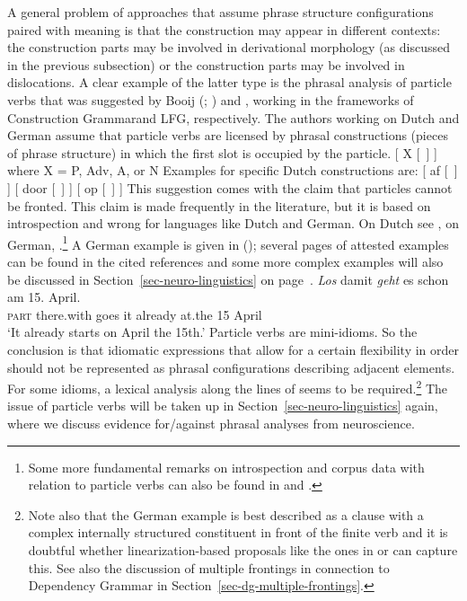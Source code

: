 \begin{exe}
\begin{xlist}[iv.]
\begin{exe}
\begin{xlist}[iv.]
A general problem of approaches that assume phrase structure configurations paired with meaning is
that the construction may appear in different contexts: the construction parts may be involved in
derivational morphology (as discussed in the previous subsection) or the construction parts may be
involved in dislocations. A clear example of the latter type is the phrasal analysis of particle
verbs that was suggested by Booij (\citeyear[Section~2]{Booij2002a}; \citeyear{Booij2012a-u}) and  \citet{Blom2005a}, working in the
frameworks of Construction Grammar\indexcxg and LFG\indexlfg, respectively. The authors working on Dutch and German assume that particle verbs are licensed by
phrasal constructions (pieces of phrase structure) in which the first slot is occupied by the particle. 
\ea
{}[ X [~] ] where X = P, Adv, A, or N
\z
Examples for specific Dutch constructions are:
\eal
\label{particle-konstruktionen}
\ex {}[ af   [~] ]
\ex {}[ door [~] ]
\ex {}[ op   [~] ]
\zl 
This suggestion comes with the claim that particles cannot be fronted.  This claim is made
frequently in the literature, but it is based on introspection and wrong for languages like Dutch and German. On Dutch see , on German,
.\footnote{%
Some more fundamental remarks on
introspection and corpus data with relation to particle verbs can also be found in
 and .
} 
A German example is given in (); several pages of attested examples can be found in the cited references and some more complex examples will
also be discussed in Section~\ref{sec-neuro-linguistics} on page~\pageref{ex-complex-vf}.
\ea\label{bsp-los-damit-zwei}
\gll \emph{Los} damit \emph{geht} es schon am 15. April.\footnotemark\\
     \textsc{part} there.with goes it already at.the 15 April\\%
%
\glt `It already starts on April the 15th.'
\z
Particle verbs are mini-idioms. So the conclusion is that idiomatic expressions that 
allow for a certain flexibility in order should not be represented as phrasal configurations describing adjacent
elements. For some idioms, a lexical analysis along the lines of  seems to be
required.\footnote{Note also that the German example is best described as a clause with a complex internally 
  structured constituent in front of the finite verb and it is doubtful whether linearization-based
  proposals like the ones in  or  can capture
  this. See also the discussion of multiple frontings in connection to Dependency Grammar in Section~\ref{sec-dg-multiple-frontings}.
}
The issue of particle verbs will be taken up in Section~\ref{sec-neuro-linguistics} again, where we
discuss evidence for/against phrasal analyses from neuroscience.




\end{xlist}
\end{exe}
\end{xlist}
\end{exe}
